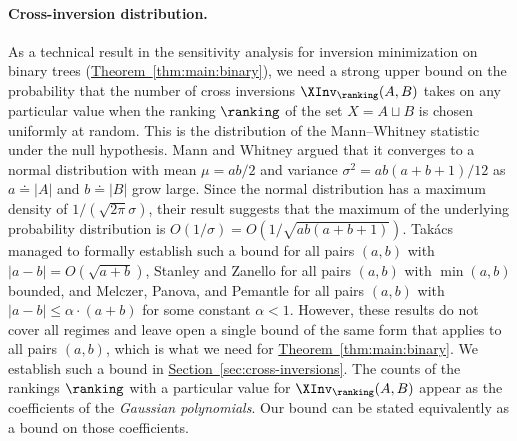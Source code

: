 \documentclass[11pt]{article}
\numberwithin{equation}{section}
\theoremstyle{definition}
\theoremstyle{plain}
\newcommand{\expref}[2]{\hyperref[#2]{#1~\ref{#2}}}
\begin{document}
\paragraph{Cross-inversion distribution.}
As a technical result in the sensitivity analysis for inversion minimization on binary trees (\expref{Theorem}{thm:main:binary}), we need a strong upper bound on the probability that the number of cross inversions $\XInv_\ranking(A,B)$ takes on any particular value when the ranking $\ranking$ of the set $X = A \sqcup B$ is chosen uniformly at random. This is the distribution of the Mann--Whitney statistic under the null hypothesis. Mann and Whitney \cite{MannWhitney1947} argued that it converges to a normal distribution with mean $\mu=ab/2$ and variance $\sigma^2=ab(a+b+1)/12$ as $a \doteq |A|$ and $b \doteq |B|$ grow large. Since the normal distribution has a maximum density of $1/(\sqrt{2\pi}\sigma)$, their result suggests that the maximum of the underlying probability distribution is $O(1/\sigma)=O(1/\sqrt{ab(a+b+1)})$. Tak\'acs \cite{Takacs1986} managed to formally establish such a bound for all pairs $(a,b)$ with $|a-b|=O(\sqrt{a+b})$, Stanley and Zanello \cite{SZ15} for all pairs $(a,b)$ with $\min(a,b)$ bounded, and Melczer, Panova, and Pemantle \cite{MPP20} for all pairs $(a,b)$ with $|a-b|\le \alpha\cdot(a+b)$ for some constant $\alpha<1$. However, these results do not cover all regimes and leave open a single bound of the same form that applies to all pairs $(a,b)$, which is what we need for \expref{Theorem}{thm:main:binary}. We establish such a bound in \expref{Section}{sec:cross-inversions}. The counts of the rankings $\ranking$ with a particular value for $\XInv_\ranking(A,B)$ appear as the coefficients of the \emph{Gaussian polynomials}.
Our bound can be stated equivalently as a bound on those coefficients.
\end{document}

